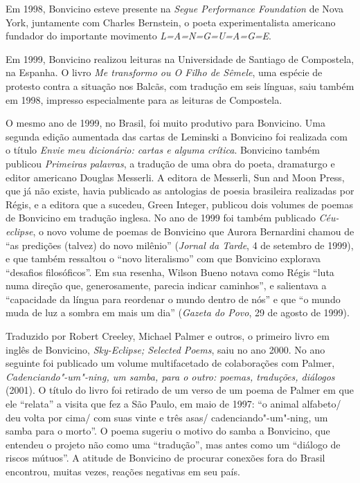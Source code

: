 Em 1998, Bonvicino esteve presente na \emph{Segue Performance
Foundation} de Nova York, juntamente com Charles Bernstein, o poeta
experimentalista americano fundador do importante movimento
\emph{L=A=N=G=U=A=G=E}.

Em 1999, Bonvicino realizou leituras na Universidade de Santiago de
Compostela, na Espanha. O livro \emph{Me transformo ou O Filho de
Sêmele}, uma espécie de protesto contra a situação nos Balcãs, com
tradução em seis línguas, saiu também em 1998, impresso especialmente
para as leituras de Compostela.

O mesmo ano de 1999, no Brasil, foi muito produtivo para Bonvicino. Uma
segunda edição aumentada das cartas de Leminski a Bonvicino foi
realizada com o título \emph{Envie meu dicionário: cartas e alguma
crítica}. Bonvicino também publicou \emph{Primeiras palavras}, a
tradução de uma obra do poeta, dramaturgo e editor americano Douglas
Messerli. A editora de Messerli, Sun and Moon Press, que já não existe,
havia publicado as antologias de poesia brasileira realizadas por Régis,
e a editora que a sucedeu, Green Integer, publicou dois volumes de
poemas de Bonvicino em tradução inglesa. No ano de 1999 foi também
publicado \emph{Céu-eclipse}, o novo volume de poemas de Bonvicino que
Aurora Bernardini chamou de ``as predições (talvez) do novo milênio''
(\emph{Jornal da Tarde}, 4 de setembro de 1999), e que também ressaltou
o ``novo literalismo'' com que Bonvicino explorava ``desafios
filosóficos''. Em sua resenha, Wilson Bueno notava como Régis ``luta
numa direção que, generosamente, parecia indicar caminhos'', e
salientava a ``capacidade da língua para reordenar o mundo dentro de
nós'' e que ``o mundo muda de luz a sombra em mais um dia''
(\emph{Gazeta do Povo}, 29 de agosto de 1999).

Traduzido por Robert Creeley, Michael Palmer e outros, o primeiro livro
em inglês de Bonvicino, \emph{Sky-Eclipse; Selected Poems}, saiu no ano
2000. No ano seguinte foi publicado um volume multifacetado de
colaborações com Palmer, \emph{Cadenciando"-um"-ning, um samba, para o
outro: poemas, traduções, diálogos} (2001). O título do livro foi
retirado de um verso de um poema de Palmer em que ele ``relata'' a
visita que fez a São Paulo, em maio de 1997: ``o animal alfabeto/ deu
volta por cima/ com suas vinte e três asas/ cadenciando"-um"-ning, um
samba para o morto''. O poema sugeriu o motivo do samba a Bonvicino, que
entendeu o projeto não como uma ``tradução'', mas antes como um
``diálogo de riscos mútuos''. A atitude de Bonvicino de procurar
conexões fora do Brasil encontrou, muitas vezes, reações negativas em
seu país.

